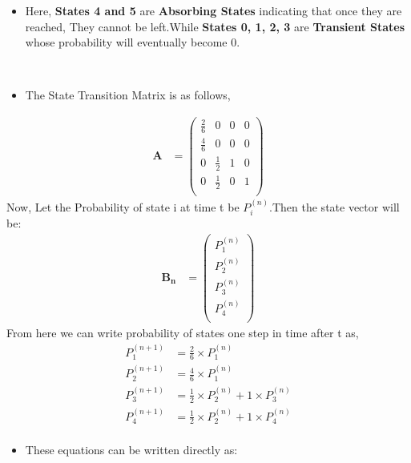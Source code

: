 \documentclass[journal,12pt,onecolumn]{IEEEtran}
\begin{document}
\begin{itemize}
\item  Here, \textbf{States 4 and 5} are \textbf{Absorbing States} indicating that once they are reached, They cannot be left.While \textbf{States 0, 1, 2, 3} are \textbf{Transient States} whose probability will eventually become 0.\\
\end{itemize}  
\begin{align*}
\\
\\
\end{align*} 
\begin{itemize}
\item The State Transition Matrix is as follows,
\end{itemize}
\begin{align}
\textbf{A} &= 
\begin{pmatrix} 
\frac{2}{6} & 0 & 0 & 0  \\[4pt]
\frac{4}{6} & 0 & 0 & 0 \\[4pt]
0 & \frac{1}{2} & 1 & 0 \\[4pt]
0 & \frac{1}{2} & 0 & 1 \\[4pt]
\end{pmatrix}
\end{align}
Now, Let the Probability of state i at time t be $P_{i}^{(n)}$.Then the state vector will be: 
\begin{align}
\label{eq:5}
\mathbf{B_{n}} &= 
\begin{pmatrix}
P_{1}^{(n)} \\[2pt]
P_{2}^{(n)} \\[2pt]
P_{3}^{(n)} \\[2pt]
P_{4}^{(n)} \\[2pt]
\end{pmatrix}
\end{align}
From here we can write probability of states one step in time after t as,
\begin{align}
    P_{1}^{(n+1)} &=  \frac{2}{6} \times P_{1}^{(n)}  \\
    P_{2}^{(n+1)} &=  \frac{4}{6} \times P_{1}^{(n)}\\
    P_{3}^{(n+1)} &=  \frac{1}{2} \times P_{2}^{(n)} + 1 \times P_{3}^{(n)}  \\
    P_{4}^{(n+1)} &= \frac{1}{2} \times P_{2}^{(n)} + 1 \times P_{4}^{(n)}   \\  
\end{align}
\begin{itemize}
    \item These equations can be written directly as:
\end{itemize}
\end{document}
